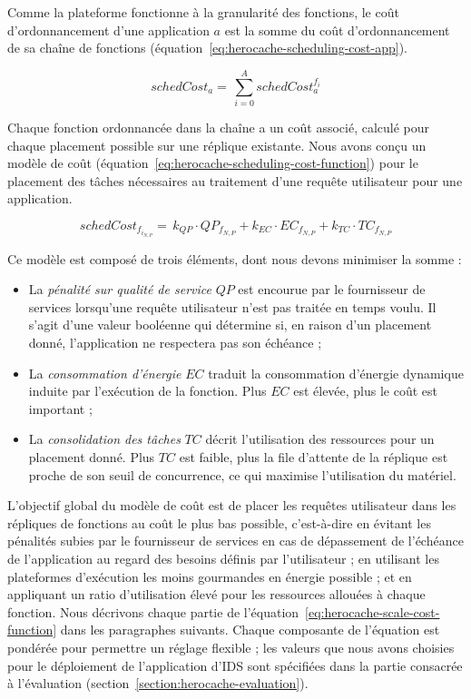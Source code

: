 {Comme la plateforme fonctionne à la granularité des fonctions, le coût d'ordonnancement d'une application $a$ est la somme du coût d'ordonnancement de sa chaîne de fonctions (équation~\ref{eq:herocache-scheduling-cost-app}).

\begin{equation}
    schedCost_{a} = \, \sum_{i = 0}^{A} schedCost^{{{f}_{i}}}_{a}
\label{eq:herocache-scheduling-cost-app}
\end{equation}

Chaque fonction ordonnancée dans la chaîne a un coût associé, calculé pour chaque placement possible sur une réplique existante. Nous avons conçu un modèle de coût (équation~\ref{eq:herocache-scheduling-cost-function}) pour le placement des tâches nécessaires au traitement d'une requête utilisateur pour une application.

\begin{equation}
    schedCost_{{f}_{{i}_{N, P}}} = \, k_{QP} \cdot QP_{{f}_{N, P}} + k_{EC} \cdot {EC}_{{f}_{N, P}} + k_{TC} \cdot TC_{{f}_{N, P}}
\label{eq:herocache-scheduling-cost-function}
\end{equation}

Ce modèle est composé de trois éléments, dont nous devons minimiser la somme :

\begin{itemize}
    \item La \textit{pénalité sur qualité de service} $QP$ est encourue par le fournisseur de services lorsqu'une requête utilisateur n'est pas traitée en temps voulu. Il s'agit d'une valeur booléenne qui détermine si, en raison d'un placement donné, l'application ne respectera pas son échéance ;
    \item La \textit{consommation d'énergie} $EC$ traduit la consommation d'énergie dynamique induite par l'exécution de la fonction. Plus $EC$ est élevée, plus le coût est important ;
    \item La \textit{consolidation des tâches} $TC$ décrit l'utilisation des ressources pour un placement donné. Plus $TC$ est faible, plus la file d'attente de la réplique est proche de son seuil de concurrence, ce qui maximise l'utilisation du matériel.
\end{itemize}

L'objectif global du modèle de coût est de placer les requêtes utilisateur dans les répliques de fonctions au coût le plus bas possible, c'est-à-dire en évitant les pénalités subies par le fournisseur de services en cas de dépassement de l'échéance de l'application au regard des besoins définis par l'utilisateur ; en utilisant les plateformes d'exécution les moins gourmandes en énergie possible ; et en appliquant un ratio d'utilisation élevé pour les ressources allouées à chaque fonction. Nous décrivons chaque partie de l'équation~\ref{eq:herocache-scale-cost-function} dans les paragraphes suivants. Chaque composante de l'équation est pondérée pour permettre un réglage flexible ; les valeurs que nous avons choisies pour le déploiement de l'application d'\gls{IDS} sont spécifiées dans la partie consacrée à l'évaluation (section~\ref{section:herocache-evaluation}).

}
